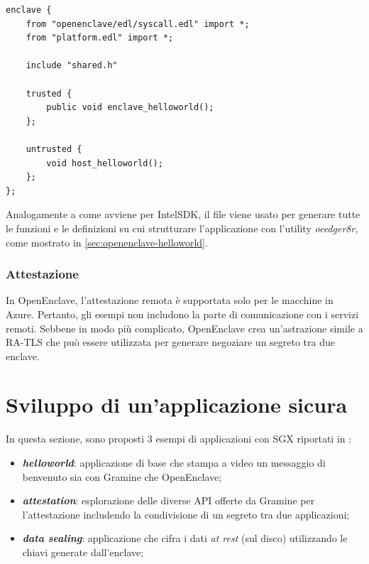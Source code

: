 \documentclass{article}
\begin{document}
\begin{lstlisting}[caption=Esempio base di un file EDL,label=lst:base-edl]
enclave {
    from "openenclave/edl/syscall.edl" import *;
    from "platform.edl" import *;
     
    include "shared.h"

    trusted {
        public void enclave_helloworld();
    };

    untrusted {
        void host_helloworld();
    };
};
\end{lstlisting}

Analogamente a come avviene per IntelSDK, il file viene usato per generare tutte le funzioni e le definizioni su cui strutturare l'applicazione con l'utility \textit{oeedger8r}, come mostrato in \cref{sec:openenclave-helloworld}.

\subsubsection{Attestazione}
In OpenEnclave, l'attestazione remota è supportata solo per le macchine in Azure. Pertanto, gli esempi non includono la parte di comunicazione con i servizi remoti. Sebbene in modo più complicato, OpenEnclave crea un'astrazione simile a RA-TLS che può essere utilizzata per generare negoziare un segreto tra due enclave.

\clearpage
\section{Sviluppo di un'applicazione sicura}
In questa sezione, sono proposti $3$ esempi di applicazioni con SGX riportati in \cite{example-repo}:
\begin{itemize}
  \item \textbf{\textit{helloworld}}: applicazione di base che stampa a video un messaggio di benvenuto sia con Gramine che OpenEnclave;
  \item \textbf{\textit{attestation}}: esplorazione delle diverse API offerte da Gramine per l'attestazione includendo la condivisione di un segreto tra due applicazioni;
  \item \textbf{\textit{data sealing}}: applicazione che cifra i dati \textit{at rest} (sul disco) utilizzando le chiavi generate dall'enclave;
\end{itemize}
\end{document}
